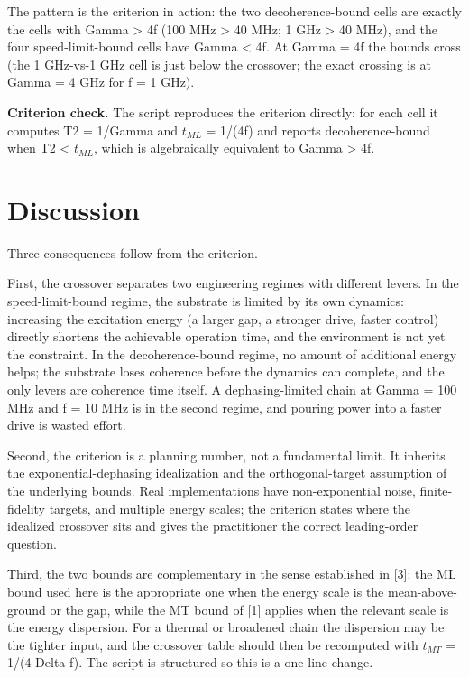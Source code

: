 \documentclass[11pt]{article}
\begin{document}
The pattern is the criterion in action: the two decoherence-bound cells are exactly the cells with Gamma > 4f (100 MHz > 40 MHz; 1 GHz > 40 MHz), and the four speed-limit-bound cells have Gamma < 4f. At Gamma = 4f the bounds cross (the 1 GHz-vs-1 GHz cell is just below the crossover; the exact crossing is at Gamma = 4 GHz for f = 1 GHz).

\textbf{Criterion check.} The script reproduces the criterion directly: for each cell it computes T2 = 1/Gamma and $t_{ML}$ = 1/(4f) and reports decoherence-bound when T2 < $t_{ML}$, which is algebraically equivalent to Gamma > 4f.

\section{Discussion}
Three consequences follow from the criterion.

First, the crossover separates two engineering regimes with different levers. In the speed-limit-bound regime, the substrate is limited by its own dynamics: increasing the excitation energy (a larger gap, a stronger drive, faster control) directly shortens the achievable operation time, and the environment is not yet the constraint. In the decoherence-bound regime, no amount of additional energy helps; the substrate loses coherence before the dynamics can complete, and the only levers are coherence time itself. A dephasing-limited chain at Gamma = 100 MHz and f = 10 MHz is in the second regime, and pouring power into a faster drive is wasted effort.

Second, the criterion is a planning number, not a fundamental limit. It inherits the exponential-dephasing idealization and the orthogonal-target assumption of the underlying bounds. Real implementations have non-exponential noise, finite-fidelity targets, and multiple energy scales; the criterion states where the idealized crossover sits and gives the practitioner the correct leading-order question.

Third, the two bounds are complementary in the sense established in [3]: the ML bound used here is the appropriate one when the energy scale is the mean-above-ground or the gap, while the MT bound of [1] applies when the relevant scale is the energy dispersion. For a thermal or broadened chain the dispersion may be the tighter input, and the crossover table should then be recomputed with $t_{MT}$ = 1/(4 Delta f). The script is structured so this is a one-line change.
\end{document}

